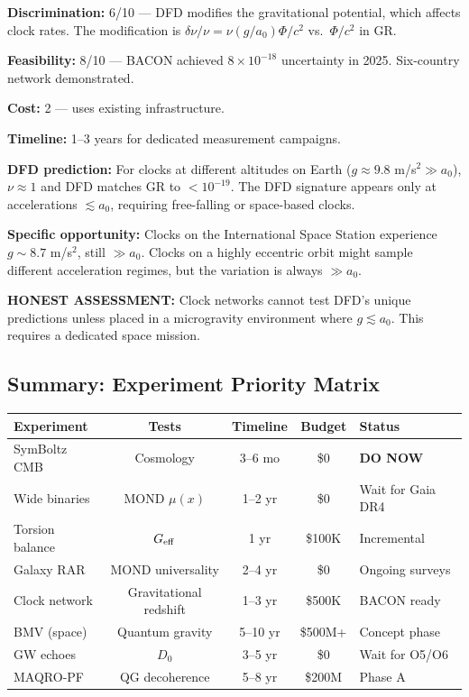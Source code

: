\documentclass[11pt,a4paper]{article}
\begin{document}
\textbf{Discrimination:} 6/10 --- DFD modifies the gravitational potential, which affects clock rates. The modification is $\delta\nu/\nu = \nu(g/a_0)\Phi/c^2$ vs.\ $\Phi/c^2$ in GR.

\textbf{Feasibility:} 8/10 --- BACON achieved $8\times10^{-18}$ uncertainty in 2025. Six-country network demonstrated.

\textbf{Cost:} 2 --- uses existing infrastructure.

\textbf{Timeline:} 1--3 years for dedicated measurement campaigns.

\textbf{DFD prediction:} For clocks at different altitudes on Earth ($g \approx 9.8$ m/s$^2 \gg a_0$), $\nu \approx 1$ and DFD matches GR to $< 10^{-19}$. The DFD signature appears only at accelerations $\lesssim a_0$, requiring free-falling or space-based clocks.

\textbf{Specific opportunity:} Clocks on the International Space Station experience $g \sim 8.7$ m/s$^2$, still $\gg a_0$. Clocks on a highly eccentric orbit might sample different acceleration regimes, but the variation is always $\gg a_0$.

\textbf{HONEST ASSESSMENT:} Clock networks cannot test DFD's unique predictions unless placed in a microgravity environment where $g \lesssim a_0$. This requires a dedicated space mission.

\subsection{Summary: Experiment Priority Matrix}

\begin{center}
\begin{tabular}{lcccl}
\toprule
\textbf{Experiment} & \textbf{Tests} & \textbf{Timeline} & \textbf{Budget} & \textbf{Status} \\
\midrule
SymBoltz CMB & Cosmology & 3--6 mo & \$0 & \textbf{DO NOW} \\
Wide binaries & MOND $\mu(x)$ & 1--2 yr & \$0 & Wait for Gaia DR4 \\
Torsion balance & $G_{\rm eff}$ & 1 yr & \$100K & Incremental \\
Galaxy RAR & MOND universality & 2--4 yr & \$0 & Ongoing surveys \\
Clock network & Gravitational redshift & 1--3 yr & \$500K & BACON ready \\
BMV (space) & Quantum gravity & 5--10 yr & \$500M+ & Concept phase \\
GW echoes & $D_0$ & 3--5 yr & \$0 & Wait for O5/O6 \\
MAQRO-PF & QG decoherence & 5--8 yr & \$200M & Phase A \\
\bottomrule
\end{tabular}
\end{center}
\end{document}
